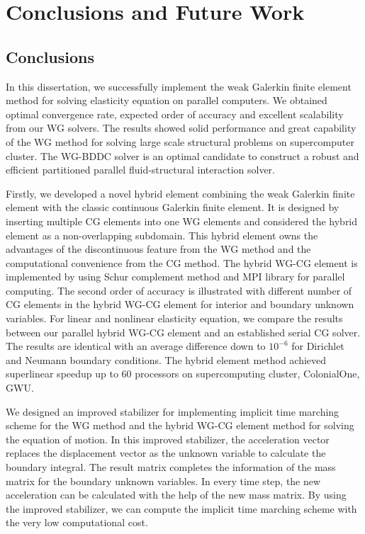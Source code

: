 \chapter{Conclusions and Future Work}

\section{Conclusions}

In this dissertation, we successfully implement the weak Galerkin finite element method for solving elasticity equation on parallel computers.  We obtained optimal convergence rate, expected order of accuracy and excellent scalability from our WG solvers. The results showed solid performance and great capability of the WG method for solving large scale structural problems on supercomputer cluster. The WG-BDDC solver is an optimal candidate to construct a robust and efficient partitioned parallel fluid-structural interaction solver.

Firstly, we developed a novel hybrid element combining the weak Galerkin finite element with the classic continuous Galerkin finite element. It is designed by inserting multiple CG elements into one WG elements and considered the hybrid element as a non-overlapping subdomain. This hybrid element owns the advantages of the discontinuous feature from the WG method and the computational convenience from the CG method. The hybrid WG-CG element is implemented by using Schur complement method and MPI library for parallel computing. The second order of accuracy is illustrated with different number of CG elements in the hybrid WG-CG element for interior and boundary unknown variables. For linear and nonlinear elasticity equation, we compare the results between our parallel hybrid WG-CG element and an established serial CG solver. The results are identical with an average difference down to $ 10^{-6} $ for Dirichlet and Neumann boundary conditions. The hybrid element method achieved superlinear speedup up to 60 processors on supercomputing cluster, ColonialOne, GWU.


We designed an improved stabilizer for implementing implicit time marching scheme for the WG method and the hybrid WG-CG element method for solving the equation of motion. In this improved stabilizer, the acceleration vector replaces the displacement vector as the unknown variable to calculate the boundary integral. The result matrix completes the information of the mass matrix for the boundary unknown variables. In every time step, the new acceleration can be calculated with the help of the new mass matrix. By using the improved stabilizer, we can compute the implicit time marching scheme with the very low computational cost. 


